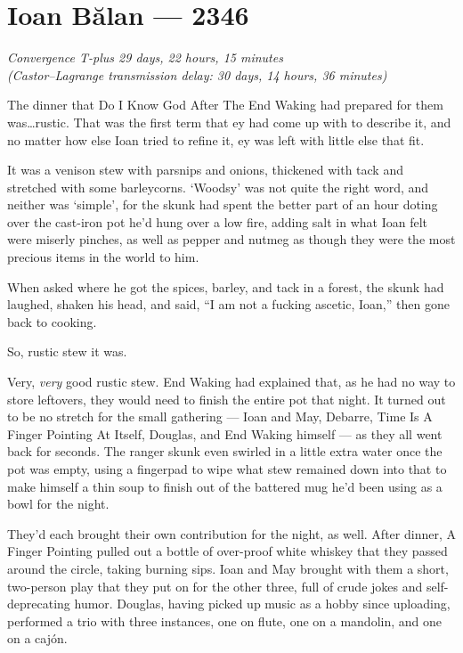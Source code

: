 \hypertarget{ioan-bux103lan-2346}{%
\chapter{Ioan Bălan — 2346}\label{ioan-bux103lan-2346}}

\begin{center}
\emph{Convergence T-plus 29 days, 22 hours, 15 minutes}\\
\emph{(Castor--Lagrange transmission delay: 30 days, 14 hours, 36 minutes)}
\end{center}

\noindent The dinner that Do I Know God After The End Waking had prepared for them was\ldots rustic. That was the first term that ey had come up with to describe it, and no matter how else Ioan tried to refine it, ey was left with little else that fit.

It was a venison stew with parsnips and onions, thickened with tack and stretched with some barleycorns. `Woodsy' was not quite the right word, and neither was `simple', for the skunk had spent the better part of an hour doting over the cast-iron pot he'd hung over a low fire, adding salt in what Ioan felt were miserly pinches, as well as pepper and nutmeg as though they were the most precious items in the world to him.

When asked where he got the spices, barley, and tack in a forest, the skunk had laughed, shaken his head, and said, ``I am not a fucking ascetic, Ioan,'' then gone back to cooking.

So, rustic stew it was.

Very, \emph{very} good rustic stew. End Waking had explained that, as he had no way to store leftovers, they would need to finish the entire pot that night. It turned out to be no stretch for the small gathering — Ioan and May, Debarre, Time Is A Finger Pointing At Itself, Douglas, and End Waking himself — as they all went back for seconds. The ranger skunk even swirled in a little extra water once the pot was empty, using a fingerpad to wipe what stew remained down into that to make himself a thin soup to finish out of the battered mug he'd been using as a bowl for the night.

They'd each brought their own contribution for the night, as well. After dinner, A Finger Pointing pulled out a bottle of over-proof white whiskey that they passed around the circle, taking burning sips. Ioan and May brought with them a short, two-person play that they put on for the other three, full of crude jokes and self-deprecating humor. Douglas, having picked up music as a hobby since uploading, performed a trio with three instances, one on flute, one on a mandolin, and one on a cajón.

